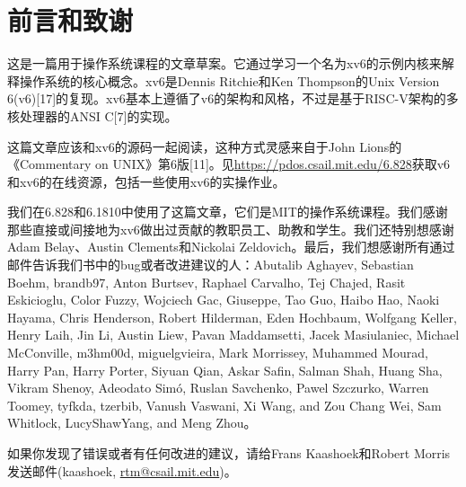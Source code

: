 \chapter*{前言和致谢}

这是一篇用于操作系统课程的文章草案。它通过学习一个名为xv6的示例内核来解释操作系统的核心概念。xv6是Dennis Ritchie和Ken Thompson的Unix Version 6(v6)[17]的复现。xv6基本上遵循了v6的架构和风格，不过是基于RISC-V架构的多核处理器的ANSI C[7]的实现。

这篇文章应该和xv6的源码一起阅读，这种方式灵感来自于John Lions的《Commentary on UNIX》第6版[11]。见\url{https://pdos.csail.mit.edu/6.828}获取v6和xv6的在线资源，包括一些使用xv6的实操作业。

我们在6.828和6.1810中使用了这篇文章，它们是MIT的操作系统课程。我们感谢那些直接或间接地为xv6做出过贡献的教职员工、助教和学生。我们还特别想感谢Adam Belay、Austin Clements和Nickolai Zeldovich。最后，我们想感谢所有通过邮件告诉我们书中的bug或者改进建议的人：Abutalib Aghayev, Sebastian Boehm, brandb97, Anton Burtsev, Raphael Carvalho, Tej Chajed, Rasit Eskicioglu, Color Fuzzy, Wojciech Gac, Giuseppe, Tao Guo, Haibo Hao, Naoki Hayama, Chris Henderson, Robert Hilderman, Eden Hochbaum, Wolfgang Keller, Henry Laih, Jin Li, Austin Liew, Pavan Maddamsetti, Jacek Masiulaniec, Michael McConville, m3hm00d, miguelgvieira, Mark Morrissey, Muhammed Mourad, Harry Pan, Harry Porter, Siyuan Qian, Askar Safin, Salman Shah, Huang Sha, Vikram Shenoy, Adeodato Simó, Ruslan Savchenko, Pawel Szczurko, Warren Toomey, tyfkda, tzerbib, Vanush Vaswani, Xi Wang, and Zou Chang Wei, Sam Whitlock, LucyShawYang, and Meng Zhou。

如果你发现了错误或者有任何改进的建议，请给Frans Kaashoek和Robert Morris发送邮件(kaashoek, \url{rtm@csail.mit.edu})。

